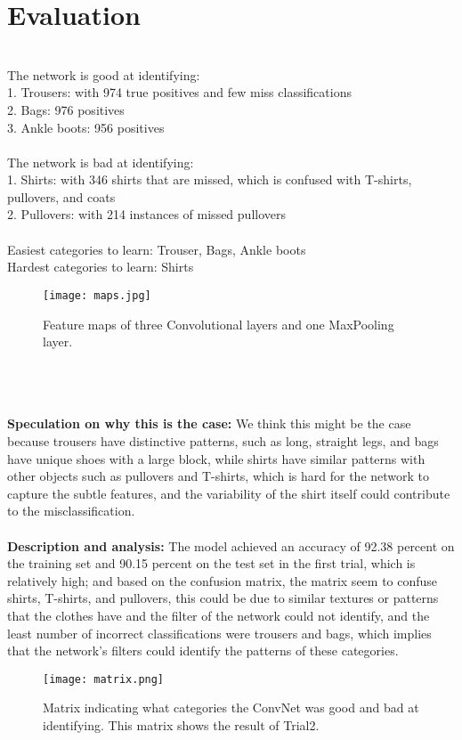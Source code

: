 \documentclass[11pt]{article}
\begin{document}
\section{Evaluation}

\\ The network is good at identifying:
\\     1. Trousers: with 974 true positives and few miss classifications
\\     2. Bags: 976 positives
\\     3. Ankle boots: 956 positives
\\
\\ The network is bad at identifying:
\\     1. Shirts: with 346 shirts that are missed, which is confused with T-shirts, 
pullovers, and coats
\\     2. Pullovers: with 214 instances of missed pullovers
\\
\\ Easiest categories to learn: Trouser, Bags, Ankle boots
\\ Hardest categories to learn: Shirts

\begin{figure}[H]
  \begin{center}
  \texttt{[image: maps.jpg]}
  \end{center}
  \caption{Feature maps of three Convolutional layers and one MaxPooling layer.}
  \label{environment}
  \end{figure}

\\ 
\\
\\
\noindent \textbf{Speculation on why this is the case: } We think this might be the case 
because trousers have distinctive patterns, such as long, straight legs, and bags 
have unique shoes with a large block, while shirts have similar patterns with other 
objects such as pullovers and T-shirts, which is hard for the network to capture the 
subtle features, and the variability of the shirt itself could contribute to the 
misclassification. 
\\
\\ \textbf{Description and analysis: } The model achieved an accuracy of 92.38 percent
 on the training set and 90.15 percent on the test set in the first trial, which is 
 relatively high; and based on the confusion matrix, the matrix seem to confuse shirts, 
 T-shirts, and pullovers, this could be due to similar textures or patterns that the 
 clothes have and the filter of the network could not identify, and the least number 
 of incorrect classifications were trousers and bags, which implies that the network's 
 filters could identify the patterns of these categories. 

\begin{figure}[H]
  \begin{center}
  \texttt{[image: matrix.png]}
  \end{center}
  \caption{Matrix indicating what categories the ConvNet was good and bad at identifying. This
  matrix shows the result of Trial2.}
  \label{environment}
  \end{figure}
\end{document}
